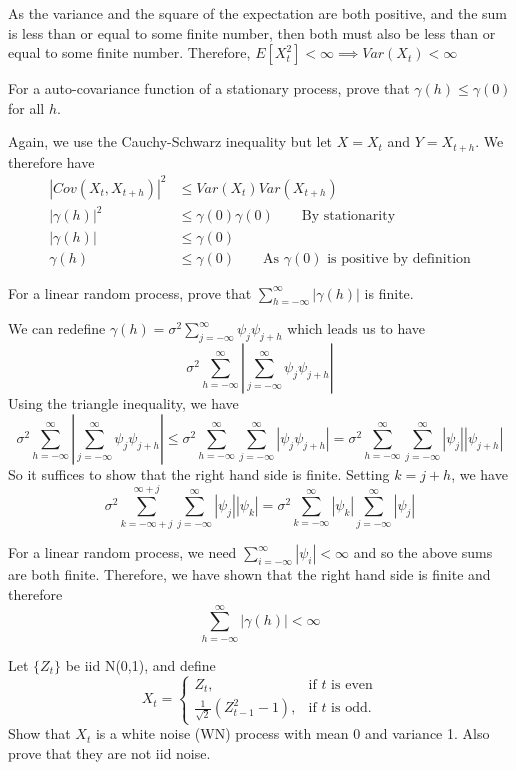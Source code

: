 \documentclass[10pt,a4paper]{exam}
\begin{document}
\begin{questions}
\begin{solution}
As the variance and the square of the expectation are both positive, and the sum is less than or equal to some finite number, then both must also be less than or equal to some finite number. Therefore, $E[X_t^2] < \infty \implies Var(X_t) < \infty$
\end{solution}

\question For a auto-covariance function of a stationary process, prove that $\gamma(h) \leq \gamma(0)$ for all $h$.
\begin{solution}
Again, we use the Cauchy-Schwarz inequality but let $X = X_t$ and $Y = X_{t+h}$.
We therefore have
\begin{align*}
|Cov(X_t, X_{t+h})|^2 	&\leq Var(X_t)Var(X_{t+h})\\
|\gamma(h)|^2			&\leq \gamma(0)\gamma(0) \quad \quad \text{By stationarity}\\
|\gamma(h)|				&\leq \gamma(0)\\
\gamma(h)				&\leq \gamma(0) \quad \quad \text{As }\gamma(0)\text{ is positive by definition}
\end{align*}
\end{solution}
\question For a linear random process, prove that $\sum_{h=-\infty}^\infty |\gamma(h)|$ is finite.

\begin{solution}
We can redefine $\gamma(h) = \sigma^2\sum_{j = -\infty}^\infty \psi_j \psi_{j+h}$ which leads us to have
$$\sigma^2\sum_{h=-\infty}^\infty \left|\sum_{j = -\infty}^\infty \psi_j \psi_{j+h}\right|$$
Using the triangle inequality, we have
$$\sigma^2\sum_{h=-\infty}^\infty \left|\sum_{j = -\infty}^\infty \psi_j \psi_{j+h}\right| \leq \sigma^2\sum_{h=-\infty}^\infty\sum_{j = -\infty}^\infty  \left|\psi_j \psi_{j+h}\right| = \sigma^2\sum_{h=-\infty}^\infty\sum_{j = -\infty}^\infty  \left|\psi_j\right|\left| \psi_{j+h}\right|$$
So it suffices to show that the right hand side is finite. Setting $k = j + h$, we have
$$\sigma^2\sum_{k=-\infty+j}^{\infty+j}\sum_{j = -\infty}^\infty  \left|\psi_j\right|\left| \psi_{k}\right| = \sigma^2 \sum_{k = -\infty}^\infty |\psi_k| \sum_{j = -\infty}^\infty |\psi_j|$$ 

For a linear random process, we need $\sum_{i = -\infty}^\infty |\psi_i| < \infty$ and so the above sums are both finite. Therefore, we have shown that the right hand side is finite and therefore
$$\sum_{h=-\infty}^\infty |\gamma(h)| < \infty$$\end{solution}

\question Let $\{Z_t\}$ be iid N(0,1), and define
$$X_t = \begin{cases}
Z_t, & \text{if }t\text{ is even}\\
\frac{1}{\sqrt{2}}(Z_{t-1}^2 - 1), & \text{if }t\text{ is odd.}
\end{cases}$$
Show that $X_t$ is a white noise (WN) process with mean 0 and variance 1. Also prove that they are not iid noise.


\end{questions}
\end{document}
